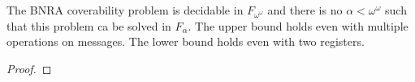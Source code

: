 \begin{theorem}
	The BNRA coverability problem is decidable in $F_{\omega^\omega}$ and there is no $\alpha < \omega^\omega$ such that this problem ca be solved in $F_{\alpha}$.
	The upper bound holds even with multiple operations on messages.
	The lower bound holds even with two registers.
\end{theorem}

\ifproofs
\begin{proof}
\end{proof}
\fi

